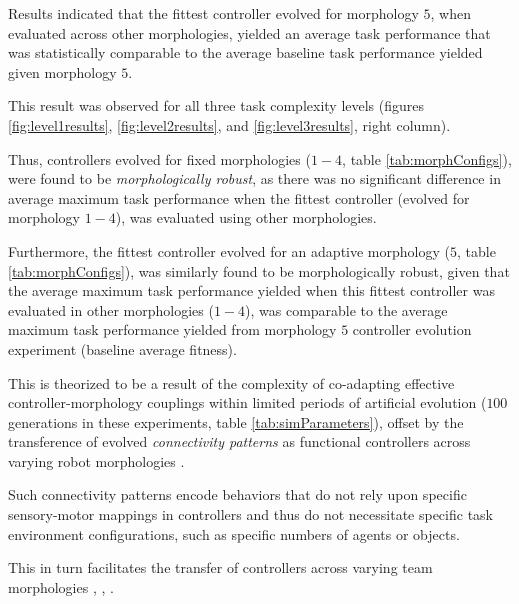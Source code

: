 Results indicated that the fittest controller evolved for morphology $5$, when evaluated across
other morphologies, yielded an average task performance that was statistically comparable to
the average baseline task performance yielded given morphology $5$.

This result was observed for all three task complexity levels
(figures \ref{fig:level1results}, \ref{fig:level2results}, and \ref{fig:level3results}, right column).

Thus, controllers evolved for fixed morphologies ($1-4$, table \ref{tab:morphConfigs}), were
found to be \textit{morphologically robust}, as there was no significant difference in average maximum
task performance when the fittest controller (evolved for morphology $1-4$), was evaluated using other
morphologies.

Furthermore, the fittest controller evolved for an adaptive morphology ($5$, table \ref{tab:morphConfigs}),
was similarly found to be morphologically robust, given that the average maximum task performance
yielded when this fittest controller was evaluated in other morphologies ($1-4$), was comparable to
the average maximum task performance yielded from morphology $5$ controller evolution experiment (baseline average fitness).

This is theorized to be a result of the complexity of co-adapting effective controller-morphology
couplings \cite{PfeiferBongard2006} within limited periods of artificial evolution ($100$ generations in these experiments,
table \ref{tab:simParameters}), offset by the transference of evolved
\textit{connectivity patterns} \cite{GauciStanley2010} as functional controllers across varying
robot morphologies  \cite{RisiStanley2013}.

Such connectivity patterns encode behaviors that do not rely upon specific sensory-motor mappings in
controllers and thus do not necessitate specific task environment configurations,
such as specific numbers of agents or objects.

This in turn facilitates the transfer of controllers across varying team morphologies
\cite{verbancsics_evolving_2010}, \cite{DidiNitschke2016SSCI}, \cite{DidiNitschke2016}.

